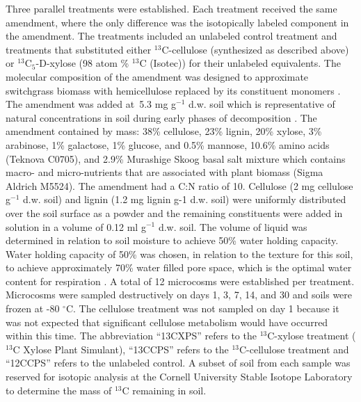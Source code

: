 \documentclass{article}
\begin{document}
Three parallel treatments were established. Each treatment received the same
amendment, where the only difference was the isotopically labeled component in
the amendment. The treatments included an unlabeled control treatment and
treatments that substituted either $^{13}$C-cellulose (synthesized as described
above) or $^{13}$C$_{5}$-D-xylose (98 atom \% $^{13}$C (Isotec)) for their
unlabeled equivalents. The molecular composition of the amendment was designed
to approximate switchgrass biomass with hemicellulose replaced by its
constituent monomers \citep{Yan_2010,David_2010}. The amendment was added
at~5.3 mg g$^{-1}$ d.w. soil which is representative of natural concentrations
in soil during early phases of decomposition \citep{Schneckenberger_2008}. The
amendment contained by mass: 38\% cellulose, 23\% lignin, 20\% xylose, 3\%
arabinose, 1\% galactose, 1\% glucose, and 0.5\% mannose, 10.6\% amino acids
(Teknova C0705), and 2.9\% Murashige Skoog basal salt mixture which contains
macro- and micro-nutrients that are associated with plant biomass (Sigma
Aldrich M5524). The amendment had a C:N ratio of
10. Cellulose (2 mg cellulose g$^{-1}$ d.w. soil) and lignin (1.2 mg lignin g-1
d.w. soil) were uniformly distributed over the soil surface as a powder and
the remaining constituents were added in solution in a volume of
0.12 ml g$^{-1}$ d.w. soil. The volume of liquid was determined in relation to
soil moisture to achieve 50\% water holding capacity. Water holding capacity
of 50\% was chosen, in relation to the texture for this soil, to achieve
approximately 70\% water filled pore space, which is the optimal water content
for respiration \citep{Linn_1984}. A total of 12 microcosms were established
per treatment. Microcosms were sampled destructively on days 1, 3, 7, 14, and
30 and soils were frozen at -80 $^{\circ}$C. The cellulose treatment was not
sampled on day 1 because it was not expected that significant cellulose
metabolism would have occurred within this time. The abbreviation “13CXPS”
refers to the $^{13}$C-xylose treatment ($^{13}$C Xylose Plant Simulant), “13CCPS”
refers to the $^{13}$C-cellulose treatment and “12CCPS” refers to the unlabeled
control. A subset of soil from each sample was reserved for isotopic
analysis at the Cornell University Stable Isotope Laboratory to determine
the mass of $^{13}$C remaining in soil.
\end{document}
